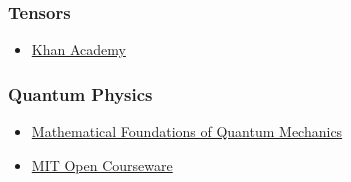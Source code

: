 \documentclass[11pt]{article}
\providecommand{\tightlist}{%
      \setlength{\itemsep}{0pt}\setlength{\parskip}{0pt}}
\newcommand{\prompt}[4]{
        \llap{{\color{#2}[#3]: #4}}\vspace{-1.25em}
    }
\begin{document}
\hypertarget{tensors}{%
\subsubsection{Tensors}\label{tensors}}

\begin{itemize}
\tightlist
\item
  \href{https://www.youtube.com/watch?v=uaQeXi4E7gA\&t=43s}{Khan
  Academy}
\end{itemize}

\hypertarget{quantum-physics}{%
\subsubsection{Quantum Physics}\label{quantum-physics}}

\begin{itemize}
\item
  \href{https://www.youtube.com/watch?v=fVfp82FpSO8\&list=PLdgVBOaXkb9Bv466YnyxslT4gIlSZdtjw}{Mathematical
  Foundations of Quantum Mechanics}
\item
  \href{https://ocw.mit.edu/courses/physics/8-05-quantum-physics-ii-fall-2013/video-lectures/}{MIT
  Open Courseware}
\end{itemize}

    \begin{tcolorbox}[breakable, size=fbox, boxrule=1pt, pad at break*=1mm,colback=cellbackground, colframe=cellborder]
\prompt{In}{incolor}{ }{\hspace{4pt}}
\begin{Verbatim}[commandchars=\\\{\}]

\end{Verbatim}
\end{tcolorbox}


    
    
    
    
\end{document}
